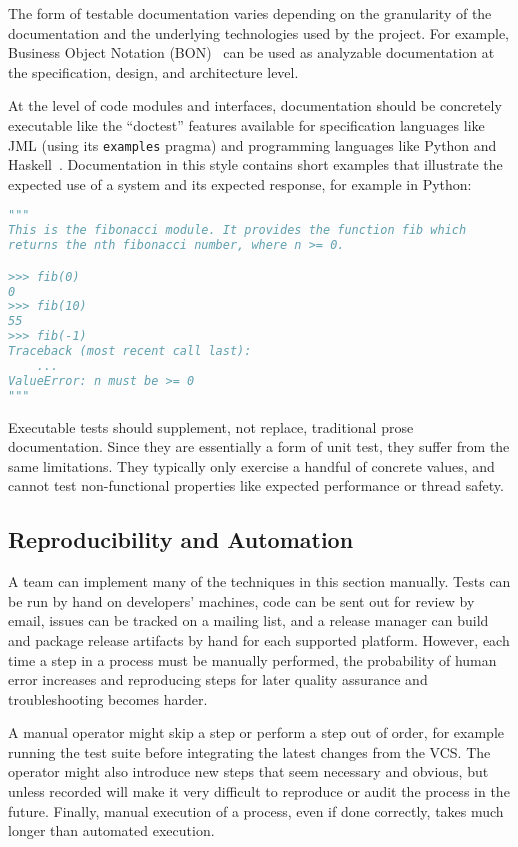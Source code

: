 The form of testable documentation varies depending on the granularity
of the documentation and the underlying technologies used by the
project. For example, Business Object Notation
(BON)~\cite{walden1995seamless} can be used as analyzable
documentation at the specification, design, and architecture level.

At the level of code modules and interfaces, documentation should be
concretely executable like the ``doctest'' features available for
specification languages like JML (using its \texttt{examples} pragma)
and programming languages like Python and
Haskell~\cite{python3doctest}. Documentation in this style contains
short examples that illustrate the expected use of a system and its
expected response, for example in Python:

\begin{lstlisting}[language=Python]
"""
This is the fibonacci module. It provides the function fib which
returns the nth fibonacci number, where n >= 0.

>>> fib(0)
0
>>> fib(10)
55
>>> fib(-1)
Traceback (most recent call last):
    ...
ValueError: n must be >= 0
"""
\end{lstlisting}

Executable tests should supplement, not replace, traditional prose
documentation. Since they are essentially a form of unit test, they
suffer from the same limitations. They typically only exercise a
handful of concrete values, and cannot test non-functional properties
like expected performance or thread safety.

\subsection{Reproducibility and Automation}

A team can implement many of the techniques in this section
manually. Tests can be run by hand on developers' machines, code can
be sent out for review by email, issues can be tracked on a mailing
list, and a release manager can build and package release artifacts by
hand for each supported platform. However, each time a step in a
process must be manually performed, the probability of human error
increases and reproducing steps for later quality assurance and
troubleshooting becomes harder.

A manual operator might skip a step or perform a step out of order,
for example running the test suite before integrating the latest
changes from the VCS. The operator might also introduce new steps that
seem necessary and obvious, but unless recorded will make it very
difficult to reproduce or audit the process in the future. Finally,
manual execution of a process, even if done correctly, takes much
longer than automated execution.


